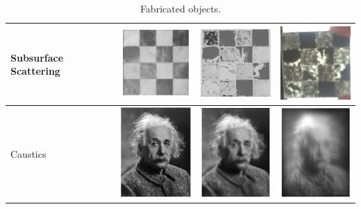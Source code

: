 \documentclass[annual]{acmsiggraph}
\begin{document}
\begin{table}
\begin{tabular}{|p{2cm}|l|l|l|}
\hline
Subsurface Scattering&  \includegraphics[width=3cm]{figure/chessTarget.png}& \includegraphics[width=3cm]{figure/chessSim.png}
& \includegraphics[width=3cm]{figure/chess.png}\\
\hline
Caustics &  \includegraphics[width=3cm]{figure/causticsTarget.png}& \includegraphics[width=3cm]{figure/causticsSim.png}
& \includegraphics[width=3cm]{figure/caustics.png}\\
\hline
\end{tabular}
\caption{Fabricated objects.}
\label{tab:result}
\end{table}
\end{document}
